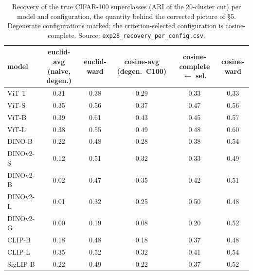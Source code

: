 \begin{table}[H]
\centering
\scriptsize
\begin{tabular}{lccccc}
\toprule
model & euclid-avg (naive, degen.) & euclid-ward & cosine-avg (degen.\ C100) & cosine-complete $\leftarrow$ sel. & cosine-ward \\
\midrule
ViT-T & 0.31 & 0.38 & 0.29 & 0.33 & 0.33 \\
ViT-S & 0.35 & 0.56 & 0.37 & 0.47 & 0.56 \\
ViT-B & 0.39 & 0.61 & 0.43 & 0.45 & 0.57 \\
ViT-L & 0.38 & 0.55 & 0.49 & 0.48 & 0.60 \\
DINO-B & 0.22 & 0.48 & 0.28 & 0.38 & 0.54 \\
DINOv2-S & 0.12 & 0.51 & 0.32 & 0.33 & 0.49 \\
DINOv2-B & 0.02 & 0.47 & 0.35 & 0.42 & 0.51 \\
DINOv2-L & 0.01 & 0.32 & 0.25 & 0.50 & 0.48 \\
DINOv2-G & 0.00 & 0.19 & 0.08 & 0.20 & 0.52 \\
CLIP-B & 0.18 & 0.48 & 0.18 & 0.37 & 0.48 \\
CLIP-L & 0.35 & 0.52 & 0.32 & 0.41 & 0.54 \\
SigLIP-B & 0.22 & 0.49 & 0.22 & 0.37 & 0.52 \\
\bottomrule
\end{tabular}
\caption{Recovery of the true CIFAR-100 superclasses (ARI of the 20-cluster cut) per model and configuration, the quantity behind the corrected picture of \S5. Degenerate configurations marked; the criterion-selected configuration is cosine-complete. Source: \texttt{exp28\_recovery\_per\_config.csv}.}
\label{tab:b11-recovery}
\end{table}
